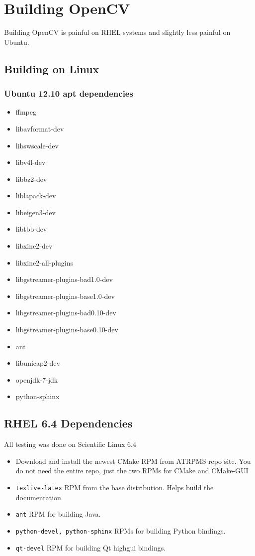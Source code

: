 \documentclass[12pt]{report}
\begin{document}
\section*{Building OpenCV}

Building OpenCV is painful on RHEL systems and slightly less painful on Ubuntu.

\subsection*{Building on Linux}

\subsubsection{Ubuntu 12.10 apt dependencies}
\begin{itemize}
\item ffmpeg
\item libavformat-dev
\item libswscale-dev
\item libv4l-dev
\item libbz2-dev
\item liblapack-dev
\item libeigen3-dev
\item libtbb-dev
\item libxine2-dev
\item libxine2-all-plugins
\item libgstreamer-plugins-bad1.0-dev
\item libgstreamer-plugins-base1.0-dev
\item libgstreamer-plugins-bad0.10-dev
\item libgstreamer-plugins-base0.10-dev
\item ant
\item libunicap2-dev
\item openjdk-7-jdk
\item python-sphinx
\end{itemize}

\subsection*{RHEL 6.4 Dependencies}
All testing was done on Scientific Linux 6.4

\begin{itemize}
\item Download and install the newest CMake RPM from ATRPMS repo site. You do not need the entire
      repo, just the two RPMs for CMake and CMake-GUI
\item \texttt{texlive-latex} RPM from the base distribution.  Helps build the documentation.
\item \texttt{ant} RPM for building Java.
\item \texttt{python-devel, python-sphinx} RPMs for building Python bindings.
\item \texttt{qt-devel} RPM for building Qt highgui bindings.
\end{itemize}
\end{document}

